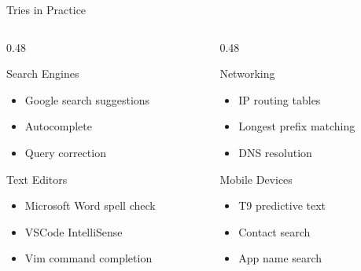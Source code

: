 \documentclass[aspectratio=169,xcolor=dvipsnames]{beamer}
\begin{document}
\begin{frame}{Tries in Practice}
  \begin{columns}
    \begin{column}{0.48\textwidth}
      \begin{block}{Search Engines}
        \begin{itemize}
          \item Google search suggestions
          \item Autocomplete
          \item Query correction
        \end{itemize}
      \end{block}

      \begin{block}{Text Editors}
        \begin{itemize}
          \item Microsoft Word spell check
          \item VSCode IntelliSense
          \item Vim command completion
        \end{itemize}
      \end{block}
    \end{column}
    \begin{column}{0.48\textwidth}
      \begin{block}{Networking}
        \begin{itemize}
          \item IP routing tables
          \item Longest prefix matching
          \item DNS resolution
        \end{itemize}
      \end{block}

      \begin{block}{Mobile Devices}
        \begin{itemize}
          \item T9 predictive text
          \item Contact search
          \item App name search
        \end{itemize}
      \end{block}
    \end{column}
  \end{columns}
\end{frame}
\end{document}
